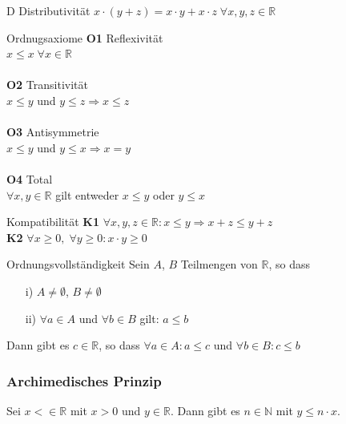 \documentclass[a4paper,10pt]{article}
\def\R{\mathbb{R}}
\begin{document}
D Distributivität $x \cdot (y + z) = x \cdot y + x \cdot z \; \forall x,y,z \in \R$

\begin{mainbox}{Ordnugsaxiome}
	\textbf{O1} Reflexivität \\$x \leqslant x \; \forall x \in \R$ \\\\
	\textbf{O2} Transitivität \\$x \leqslant y$ und $y \leqslant z \Longrightarrow x \leqslant z$ \\\\
	\textbf{O3} Antisymmetrie \\$x \leqslant y$ und $y \leqslant x \Longrightarrow x = y$ \\\\
	\textbf{O4} Total \\$ \forall x, y \in \R$ gilt entweder $x \leqslant y$ oder $y \leqslant x$
\end{mainbox}

\begin{subbox}{Kompatibilität}
	\textbf{K1} $\forall x,y,z \in \R : x \leqslant y \Longrightarrow x + z \leqslant y + z$ \\
	\textbf{K2} $ \forall x \geqslant 0, \; \forall y \geqslant 0 : x \cdot y \geqslant 0$
\end{subbox}

	
\begin{mainbox}{Ordnungsvollständigkeit}
	Sein $A$, $B$ Teilmengen von $\R$, so dass
	\begin{itemize}
		\item[i)] $A \neq \emptyset$, $B \neq \emptyset$
		\item[ii)] $\forall a \in A$ und $\forall b \in B$ gilt: $a \leqslant b$
	\end{itemize}
	Dann gibt es $c \in \R$, so dass $\forall a \in A : a \leqslant c$ und $\forall b \in B : c \leqslant b$
\end{mainbox}

\subsubsection*{Archimedisches Prinzip}
Sei $x < \in \R$ mit $x > 0$ und $y \in \R$. Dann gibt es $n \in \mathbb{N}$ mit $y \leqslant n \cdot x$. \\
\end{document}
